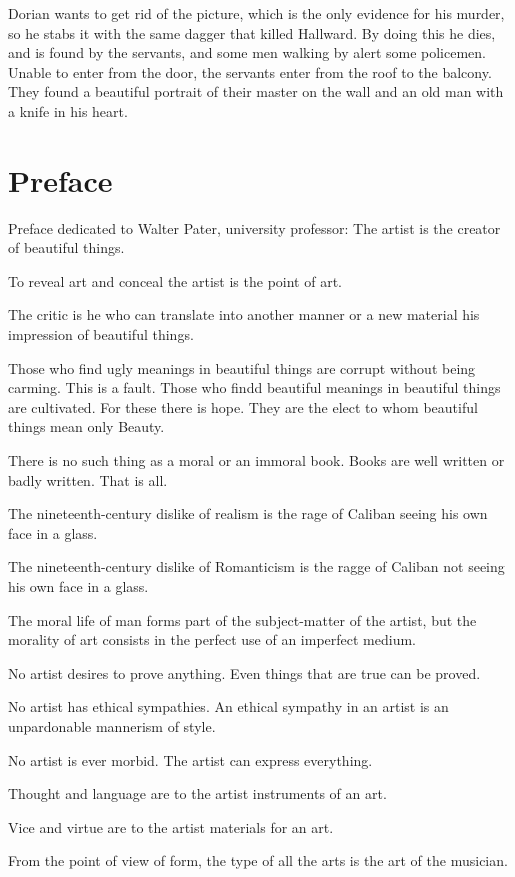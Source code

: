 \documentclass{article}
\begin{document}
Dorian wants to get rid of the picture, which is the only evidence for his murder, so he stabs it with the same dagger that killed Hallward. By doing this he dies, and is found by the servants, and some men walking by alert some policemen. Unable to enter from the door, the servants enter from the roof to the balcony. They found a beautiful portrait of their master on the wall and an old man with a knife in his heart.
\section{Preface}
Preface dedicated to Walter Pater, university professor:
The artist is the creator of beautiful things.

To reveal art and conceal the artist is the point of art.

The critic is he who can translate into another manner or a new material his impression of beautiful things.

Those who find ugly meanings in beautiful things are corrupt without being carming. This is a fault. Those who findd beautiful meanings in beautiful things are cultivated. For these there is hope. They are the elect to whom beautiful things mean only Beauty.

There is no such thing as a moral or an immoral book. Books are well written or badly written. That is all.

The nineteenth-century dislike of realism is the rage of Caliban seeing his own face in a glass.

The nineteenth-century dislike of Romanticism is the ragge of Caliban not seeing his own face in a glass.

The moral life of man forms part of the subject-matter of the artist, but the morality of art consists in the perfect use of an imperfect medium.

No artist desires to prove anything. Even things that are true can be proved.

No artist has ethical sympathies. An ethical sympathy in an artist is an unpardonable mannerism of style.

No artist is ever morbid. The artist can express everything.

Thought and language are to the artist instruments of an art.

Vice and virtue are to the artist materials for an art.

From the point of view of form, the type of all the arts is the art of the musician.
\end{document}
